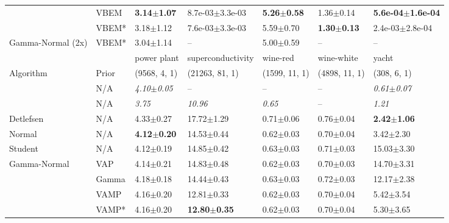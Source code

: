\begin{tabular}{lllllll}
                  & VBEM &  \textbf{3.14$\pm$1.07} &           8.7e-03$\pm$3.3e-03 &  \textbf{5.26$\pm$0.58} &           1.36$\pm$0.14 &  \textbf{5.6e-04$\pm$1.6e-04} \\
                  & VBEM* &           3.18$\pm$1.12 &           7.6e-03$\pm$3.3e-03 &           5.59$\pm$0.70 &  \textbf{1.30$\pm$0.13} &           2.4e-03$\pm$2.8e-04 \\
Gamma-Normal (2x) & VBEM* &           3.04$\pm$1.14 &                           -- &           5.00$\pm$0.59 &                     -- &                           -- \\
\midrule
                  &       &             power plant &        superconductivity &                wine-red &              wine-white &                   yacht \\
Algorithm & Prior& (9568, 4, 1)& (21263, 81, 1)& (1599, 11, 1)& (4898, 11, 1)& (308, 6, 1)\\
\midrule
\citet{sun2019functional} & N/A &  \textit{4.10$\pm$0.05} &                       -- &                      -- &                      -- &  \textit{0.61$\pm$0.07} \\
\citet{sicking2021novel} & N/A &           \textit{3.75} &           \textit{10.96} &           \textit{0.65} &                      -- &           \textit{1.21} \\
Detlefsen & N/A &           4.33$\pm$0.27 &           17.72$\pm$1.29 &           0.71$\pm$0.06 &           0.76$\pm$0.04 &  \textbf{2.42$\pm$1.06} \\
Normal & N/A &  \textbf{4.12$\pm$0.20} &           14.53$\pm$0.44 &           0.62$\pm$0.03 &           0.70$\pm$0.04 &           3.42$\pm$2.30 \\
Student & N/A &           4.12$\pm$0.19 &           14.85$\pm$0.42 &           0.63$\pm$0.03 &           0.71$\pm$0.03 &          15.03$\pm$3.30 \\
Gamma-Normal & VAP &           4.14$\pm$0.21 &           14.83$\pm$0.48 &           0.62$\pm$0.03 &           0.70$\pm$0.03 &          14.70$\pm$3.31 \\
                  & Gamma &           4.18$\pm$0.18 &           14.44$\pm$0.43 &           0.63$\pm$0.03 &           0.72$\pm$0.03 &          12.17$\pm$2.38 \\
                  & VAMP &           4.16$\pm$0.20 &           12.81$\pm$0.33 &           0.62$\pm$0.03 &           0.70$\pm$0.04 &           5.42$\pm$3.54 \\
                  & VAMP* &           4.16$\pm$0.20 &  \textbf{12.80$\pm$0.35} &           0.62$\pm$0.03 &           0.70$\pm$0.04 &           5.30$\pm$3.65 \\

\end{tabular}
